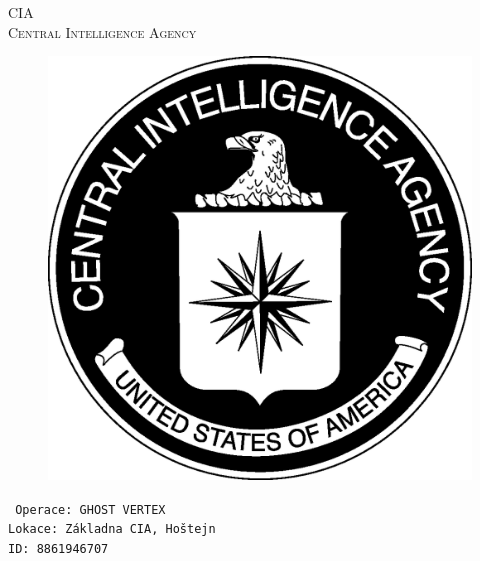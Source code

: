 \documentclass[a4paper, \fontheight]{article}
\begin{document}
	\begin{titlepage}
		\begin{center}		
			\textsc{{\fontsize{80}{0}\selectfont CIA}\\[2em]
				\Huge Central Intelligence Agency\\[2.5em]}
				
			\begin{figure}[H]
				\centering
				\includegraphics[scale=0.6]{sources/CIA_logo.eps}
			\end{figure}
		\end{center}	
		\vfill
		\noindent
		\texttt{\LARGE
				Operace: GHOST VERTEX\\[0.4em]
				Lokace: Základna CIA, Hoštejn\\[0.4em]
				ID: 8861946707}	
\end{titlepage} 
\end{document}
